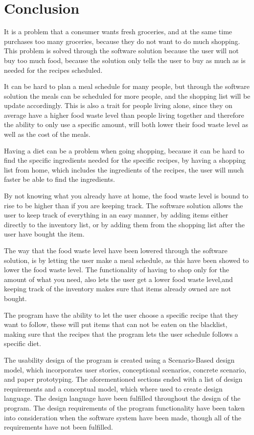 \chapter{Conclusion}

It is a problem that a consumer wants fresh groceries, and at the same time purchases too many groceries, because they do not want to do much shopping. This problem is solved through the software solution because the user will not buy too much food, because the solution only tells the user to buy as much as is needed for the recipes scheduled.

It can be hard to plan a meal schedule for many people, but through the software solution the meals can be scheduled for more people, and the shopping list will be update accordingly. This is also a trait for people living alone, since they on average have a higher food waste level than people living together and therefore the ability to only use a specific amount, will both lower their food waste level as well as the cost of the meals.

Having a diet can be a problem when going shopping, because it can be hard to find the specific ingredients needed for the specific recipes, by having a shopping list from home, which includes the ingredients of the recipes, the user will much faster be able to find the ingredients.

By not knowing what you already have at home, the food waste level is bound to rise to be higher than if you are keeping track. The software solution allows the user to keep track of everything in an easy manner, by adding items either directly to the inventory list, or by adding them from the shopping list after the user have bought the item. 

The way that the food waste level have been lowered through the software solution, is by letting the user make a meal schedule, as this have been showed to lower the food waste level. The functionality of having to shop only for the amount of what you need, also lets the user get a lower food waste level,and keeping track of the inventory makes sure that items already owned are not bought.

The program have the ability to let the user choose a specific recipe that they want to follow, these will put items that can not be eaten on the blacklist, making sure that the recipes that the program lets the user schedule follows a specific diet.

The usability design of the program is created using a Scenario-Based design model, which incorporates user stories, conceptional scenarios, concrete scenario, and paper prototyping. The aforementioned sections ended with a list of design requirements and a conceptual model, which where used to create design language. The design language have been fulfilled throughout the design of the program. The design requirements of the program functionality have been taken into consideration when the software system have been made, though all of the requirements have not been fulfilled.